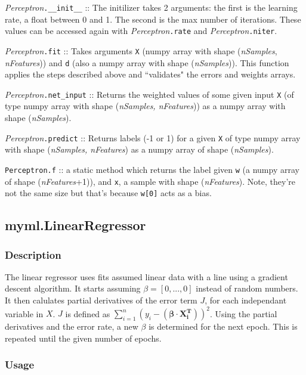 \documentclass{article}
\begin{document}
\textit{Perceptron}\texttt{.\_\_init\_\_} :: The initilizer takes 2 arguments: the
first is the learning rate, a float between 0 and 1. The second is the max
number of iterations. These values can be accessed again with
\textit{Perceptron}\texttt{.rate} and \textit{Perceptron}\texttt{.niter}.

\textit{Perceptron}\texttt{.fit} :: Takes arguments \texttt{X} (numpy array
with shape (\textit{nSamples}, \textit{nFeatures})) and \texttt{d} (also a
numpy array with shape (\textit{nSamples})). This function applies the steps
described above and ``validates" the errors and weights arrays.

\textit{Perceptron}\texttt{.net\_input} :: Returns the weighted values of some
given input \texttt{X} (of type numpy array with shape
(\textit{nSamples, nFeatures})) as a numpy array with shape (\textit{nSamples}).

\textit{Perceptron}\texttt{.predict} :: Returns labels (-1 or 1) for a given
\texttt{X} of type numpy array with shape (\textit{nSamples, nFeatures}) as a
numpy array of shape (\textit{nSamples}).

\texttt{Perceptron.f} :: a static method which returns the label given
\texttt{w} (a numpy array of shape (\textit{nFeatures}+1)), and \texttt{x}, a
sample with shape (\textit{nFeatures}). Note, they're not the same size but
that's because \texttt{w[0]} acts as a bias.

\subsection{myml.LinearRegressor}

\subsubsection{Description}

The linear regressor uses fits assumed linear data with a line using a gradient
descent algorithm. It starts assuming $\beta = [0, ..., 0]$ instead of random
numbers. It then calulates partial derivatives of the error term $J$, for each
independant variable in $X$. $J$ is defined as $\sum_{i=1}^{n}(y_i-(\mathbf{\beta}\cdot\mathbf{X^T_i}))^2$.
Using the partial derivatives and the error rate, a new $\beta$ is determined for
the next epoch. This is repeated until the given number of epochs.

\subsubsection{Usage}
\end{document}
